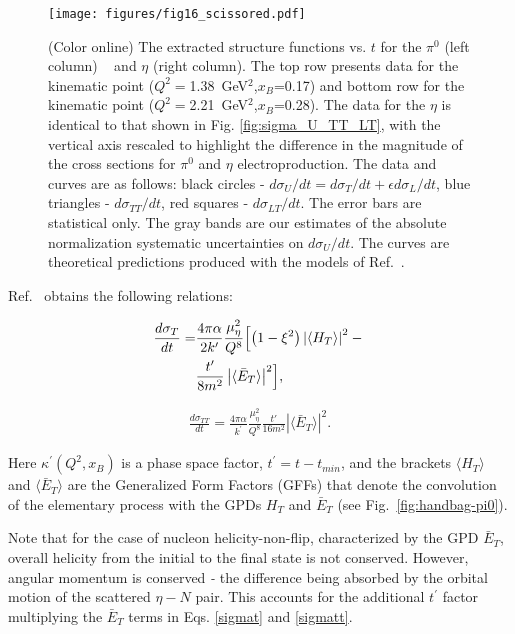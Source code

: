 \documentclass[prc,aps,floatfix,showpacs,showkeys,twocolumn,superscriptaddress,letterpaper,10pt]{revtex4-1}
\newcommand{\GPDHT}{\langle H_T \rangle}
\newcommand{\GPDETbar}{\langle \bar{E}_T \rangle}
\begin{document}
\begin{figure*}
\centering
\texttt{[image: figures/fig16\_scissored.pdf]}
\caption{
(Color online) 
The extracted structure functions vs. $t$ for 
the $\pi^0$ (left column) 
~\cite{Agashe:2014kda} 
and $\eta$ (right column). The top row presents data for the kinematic point  ($Q^2=$1.38~GeV$^2$,$x_B$=0.17)
and bottom row for the kinematic point ($Q^2=$2.21~GeV$^2$,$x_B$=0.28). The data for the $\eta$ is identical to that shown in Fig. \ref{fig:sigma_U_TT_LT}, with the vertical  axis  rescaled to highlight the difference in the magnitude of the cross sections for $\pi^0$ and $\eta$ electroproduction. 
The data and curves are as follows:  
black circles - $d\sigma_U/dt =d\sigma_T/dt +\epsilon d\sigma_L/dt$,
blue triangles - $d\sigma_{TT}/dt$,
red  squares - $d\sigma_{LT}/dt$.
The error bars are statistical only. The gray bands are our estimates of the absolute normalization systematic uncertainties on $d\sigma_U/dt $.  The curves are theoretical predictions produced  with the models of 
Ref.~\cite{Goloskokov:2011rd}.}
\label{fig:compar}
\end{figure*} 

Ref.~\cite{Goloskokov:2011rd}  obtains the following relations:
\noindent 

\begin{equation}
\begin{split}
\frac{d\sigma_{T}}{dt} =& \frac{4\pi\alpha}{2k^\prime}\frac{\mu_\eta^2}{Q^8} 
                       \Bigl[ \left(1-\xi^2\right) \left|\GPDHT\right|^2 - \Bigl. \\
                                    & \Bigr.                \frac{t'}{8m^2} \left|\GPDETbar\right|^2\Bigr],
\end{split}
\label{sigmat}
\end{equation}



\begin{align}\label{sigmatt}
\frac{d\sigma_{TT}}{dt} = \frac{4\pi\alpha}{k^\prime}\frac{\mu_\eta^2}{Q^8}\frac{t'}{16m^2}\left|\GPDETbar\right|^2.
\end{align}


\noindent Here $\kappa^\prime(Q^2,x_B)$ is a phase space factor, $t^\prime =t-t_{min}$,
 and the brackets $\langle  H_T \rangle$ and $\langle \bar E_T \rangle$ are the Generalized Form Factors (GFFs) that denote
the convolution of the elementary process with the GPDs   $H_T$ and $\bar E_T$ (see Fig.~\ref{fig:handbag-pi0}).  


Note that for the case of nucleon helicity-non-flip, characterized by  the GPD $\bar E_T$, overall helicity from the initial to the final state is not conserved. However, angular momentum  is 
conserved \emph{-} the difference being absorbed by the orbital motion of the scattered 
$\eta-N$ pair.  This accounts for the additional $t^\prime$ factor multiplying the $\bar E_T$ terms in Eqs. \ref{sigmat} and \ref{sigmatt}.  
\end{document}
